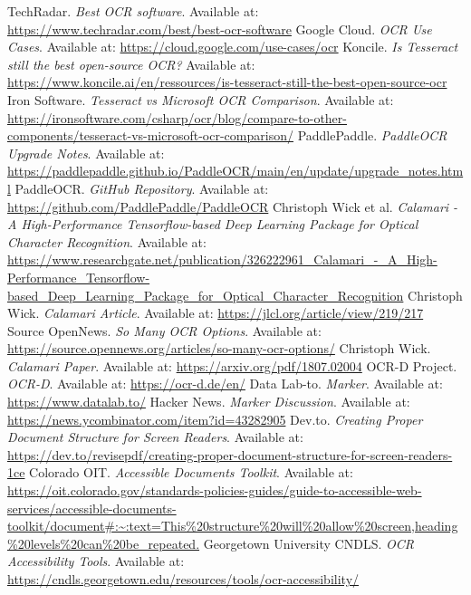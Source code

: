 \begin{thebibliography}{99}
 TechRadar. \textit{Best OCR software}. Available at: \url{https://www.techradar.com/best/best-ocr-software}
 Google Cloud. \textit{OCR Use Cases}. Available at: \url{https://cloud.google.com/use-cases/ocr}
 Koncile. \textit{Is Tesseract still the best open-source OCR?} Available at: \url{https://www.koncile.ai/en/ressources/is-tesseract-still-the-best-open-source-ocr}
 Iron Software. \textit{Tesseract vs Microsoft OCR Comparison}. Available at: \url{https://ironsoftware.com/csharp/ocr/blog/compare-to-other-components/tesseract-vs-microsoft-ocr-comparison/}
 PaddlePaddle. \textit{PaddleOCR Upgrade Notes}. Available at: \url{https://paddlepaddle.github.io/PaddleOCR/main/en/update/upgrade_notes.html}
 PaddleOCR. \textit{GitHub Repository}. Available at: \url{https://github.com/PaddlePaddle/PaddleOCR}
 Christoph Wick et al. \textit{Calamari - A High-Performance Tensorflow-based Deep Learning Package for Optical Character Recognition}. Available at: \url{https://www.researchgate.net/publication/326222961_Calamari_-_A_High-Performance_Tensorflow-based_Deep_Learning_Package_for_Optical_Character_Recognition}
 Christoph Wick. \textit{Calamari Article}. Available at: \url{https://jlcl.org/article/view/219/217}
 Source OpenNews. \textit{So Many OCR Options}. Available at: \url{https://source.opennews.org/articles/so-many-ocr-options/}
 Christoph Wick. \textit{Calamari Paper}. Available at: \url{https://arxiv.org/pdf/1807.02004}
 OCR-D Project. \textit{OCR-D}. Available at: \url{https://ocr-d.de/en/}
 Data Lab-to. \textit{Marker}. Available at: \url{https://www.datalab.to/}
 Hacker News. \textit{Marker Discussion}. Available at: \url{https://news.ycombinator.com/item?id=43282905}
 Dev.to. \textit{Creating Proper Document Structure for Screen Readers}. Available at: \url{https://dev.to/revisepdf/creating-proper-document-structure-for-screen-readers-1ce}
 Colorado OIT. \textit{Accessible Documents Toolkit}. Available at: \url{https://oit.colorado.gov/standards-policies-guides/guide-to-accessible-web-services/accessible-documents-toolkit/document#:~:text=This%20structure%20will%20allow%20screen,heading%20levels%20can%20be_repeated.}
 Georgetown University CNDLS. \textit{OCR Accessibility Tools}. Available at: \url{https://cndls.georgetown.edu/resources/tools/ocr-accessibility/}

\end{thebibliography}
